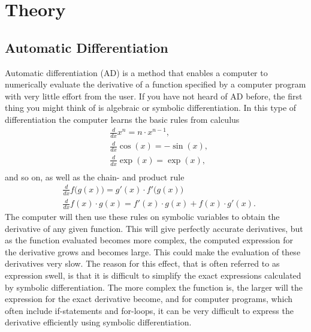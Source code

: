 \chapter{Theory}
\label{ch:theory}
\section{Automatic Differentiation}
\label{sec:AD}
Automatic differentiation (AD) is a method that enables a computer to numerically evaluate the derivative of a function specified by a computer program with very little effort from the user. If you have not heard of AD before, the first thing you might think of is algebraic or symbolic differentiation. In this type of differentiation the computer learns the basic rules from calculus
\begin{align*}
    &\frac{d}{dx}x^n     = n\cdot x^{n-1}, \\
    &\frac{d}{dx}\cos(x)  = -\sin(x), \\
    &\frac{d}{dx}\exp(x) = \exp(x), \\
\end{align*}
and so on, as well as the chain- and product rule
\begin{align*}
    &\frac{d}{dx}f\bigl(g(x)\bigr) = g'(x)\cdot f'\bigl(g(x)\bigr)\\
    &\frac{d}{dx}f(x)\cdot g(x) = f'(x)\cdot g(x) + f(x)\cdot g'(x).
\end{align*}
The computer will then use these rules on symbolic variables to obtain the derivative of any given function. This will give perfectly accurate derivatives, but as the function evaluated becomes more complex, the computed expression for the derivative grows and becomes large. This could make the evaluation of these derivatives very slow. The reason for this effect, that is often referred to as expression swell, is that it is difficult to simplify the exact expressions calculated by symbolic differentiation. The more complex the function is, the larger will the expression for the exact derivative become, and for computer programs, which often include if-statements and for-loops, it can be very difficult to express the derivative efficiently using symbolic differentiation. 

